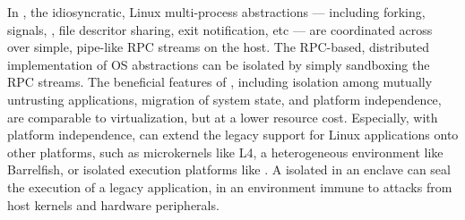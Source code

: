 In \graphene{},
the idiosyncratic, Linux multi-process abstractions
--- including forking, signals, \sysvipc{}, file descritor sharing, exit notification, etc
--- are coordinated across \picoprocs{}
over simple, pipe-like RPC streams on the host.
The RPC-based, distributed implementation of OS abstractions
can be isolated by simply sandboxing the RPC streams.
The beneficial features of \graphene{}, %
including isolation among mutually untrusting applications,
migration of system state,
and platform independence,
are comparable to virtualization,
but at a lower resource cost.
Especially, with platform independence, \graphene{}
can extend
the legacy support for Linux applications
onto other platforms,
such as microkernels like L4, a heterogeneous environment like Barrelfish,
or isolated execution platforms like .
A \graphene{} \picoproc{} isolated in an enclave
can seal the execution of a legacy application,
in an environment immune to attacks from host kernels
and hardware peripherals.





